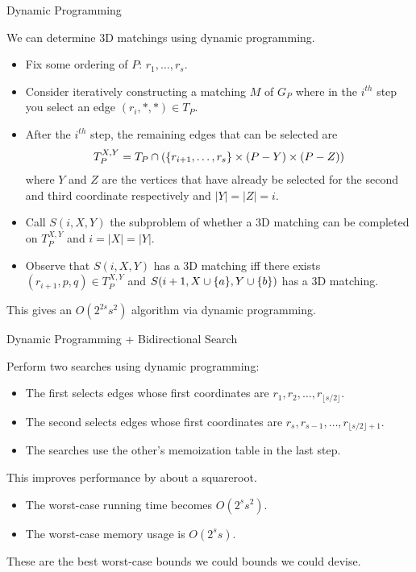 \documentclass[t,10pt,
mathserif,xcolor=dvipsnames]{beamer}
\begin{document}
\begin{myframe}{Dynamic Programming}

  We can determine 3D matchings using dynamic programming.

  \begin{itemize}
  \item Fix some ordering of $P$: $r_1,\ldots,r_s$.
  \item Consider iteratively constructing a matching $M$ of $G_P$
    where in the $i^{th}$ step you select an edge $(r_i,*,*) \in T_P$.
  \item After the $i^{th}$ step, the remaining edges that can be
    selected are $$T_P^{X,Y} = T_P \cap (\{{r_{i+1},\ldots,r_s}\} \times (P - Y)
    \times (P - Z))$$ where $Y$ and $Z$ are the vertices that have
    already be selected for the second and third coordinate
    respectively and $|Y| = |Z| = i$.
  \item Call $S(i, X, Y)$ the subproblem of whether a 3D matching can be
    completed on $T_P^{X,Y}$ and $i = |X| = |Y|$.
  \item Observe that $S(i,X,Y)$ has a 3D matching iff there exists
    $(r_{i+1},p,q) \in T_P^{X,Y}$ and $S(i+1, X \cup \{{a}\},Y \cup
    \{{b}\})$ has a 3D matching.
  \end{itemize}
  This gives an $O(2^{2s} s^2)$ algorithm via dynamic programming.
  
\end{myframe}

\begin{myframe}{Dynamic Programming + Bidirectional Search}

  Perform two searches using dynamic programming:
  \begin{itemize}
  \item The first selects edges whose first coordinates are
    $r_1,r_2,\ldots,r_{\lfloor s/2\rfloor}$.
  \item The second selects edges whose first coordinates are
    $r_s,r_{s-1},\ldots,r_{\lfloor s/2\rfloor+1}$.
  \item The searches use the other's memoization table in the last
    step.
  \end{itemize}

  \bigskip
  
  This improves performance by about a squareroot.
  \begin{itemize}
  \item The worst-case running time becomes $O(2^s s^2)$.
  \item The worst-case memory usage is $O(2^s s)$.
  \end{itemize}

  \bigskip
  
  These are the best worst-case bounds we could bounds we could devise.
  
  
\end{myframe}
\end{document}
